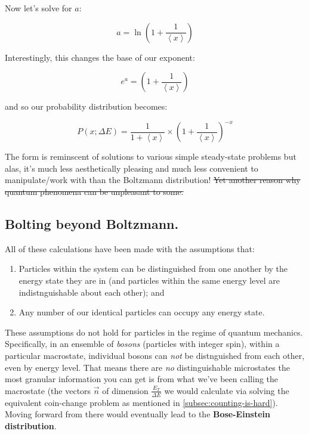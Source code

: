 \documentclass[letterpaper,12pt]{report}
\providecommand{\tightlist}{%
  \setlength{\itemsep}{0pt}\setlength{\parskip}{0pt}}
\begin{document}

Now let's solve for \(a\):

\[a = \ln{\left(1 + \frac{1}{\left<x\right>}\right)} \]

Interestingly, this changes the base of our exponent:

\[e^{a} = \left(1 + \frac{1}{\left<x\right>}\right) \]

and so our probability distribution becomes:

\[P(x;\Delta E) = \frac{1}{1 + \left<x\right>} 
      \times {\left(1 + \frac{1}{\left<x\right>}\right)}^{-x}
\]

The form is reminscent of solutions to various simple steady-state problems \textemdash{} 
but alas, it's much less aesthetically pleasing and much less
convenient to manipulate/work with than the Boltzmann distribution!
\sout{Yet another reason why quantum phenomena can be unpleasant to some.}

\subsection{Bolting beyond Boltzmann.}

All of these calculations have been made with the assumptions that:
\begin{enumerate}
  \tightlist
  \item
    Particles within the system can be distinguished from one another by the 
    energy state they are in (and particles within the same energy level are
    indistnguishable about each other); and
  \item
    Any number of our identical particles can occupy any energy state.
\end{enumerate}

These assumptions do not hold for particles in the regime of quantum mechanics.
Specifically, in an ensemble of \emph{bosons} (particles with integer spin),
within a particular macrostate,
individual bosons can \emph{not} be distnguished from each other, even by energy level.
That means there are \emph{no} distinguishable microstates \textemdash{} the most granular
information you can get is from what we've been calling the macrostate
(the vectors \(\vec{n}\) of dimension \(\frac{E_T}{\Delta E}\) we would calculate via
solving the equivalent coin-change problem as mentioned in
\ref{subsec:counting-is-hard}).
Moving forward from there would eventually
lead to the \textbf{Bose-Einstein distribution}.\par
\end{document}
